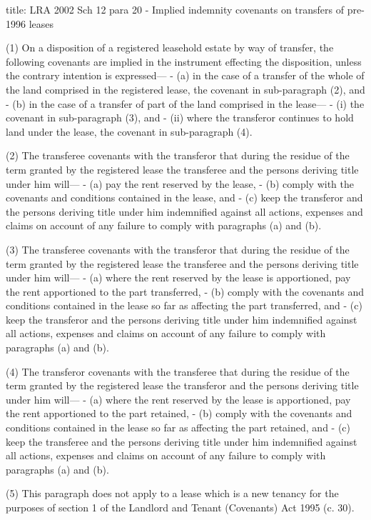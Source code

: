 \documentclass[
]{article}
\newenvironment{Shaded}{}{}
\newcommand{\NormalTok}[1]{#1}
\begin{document}
\begin{Shaded}
\begin{Highlighting}[]
\NormalTok{title: LRA 2002 Sch 12 para 20 {-} Implied indemnity covenants on transfers of pre{-}1996 leases}

\NormalTok{(1) On a disposition of a registered leasehold estate by way of transfer, the following covenants are implied in the instrument effecting the disposition, unless the contrary intention is expressed—}
\NormalTok{{-} (a) in the case of a transfer of the whole of the land comprised in the registered lease, the covenant in sub{-}paragraph (2), and}
\NormalTok{{-} (b) in the case of a transfer of part of the land comprised in the lease—}
\NormalTok{    {-} (i) the covenant in sub{-}paragraph (3), and}
\NormalTok{    {-} (ii) where the transferor continues to hold land under the lease, the covenant in sub{-}paragraph (4).}

\NormalTok{(2) The transferee covenants with the transferor that during the residue of the term granted by the registered lease the transferee and the persons deriving title under him will—}
\NormalTok{{-} (a) pay the rent reserved by the lease,}
\NormalTok{{-} (b) comply with the covenants and conditions contained in the lease, and}
\NormalTok{{-} (c) keep the transferor and the persons deriving title under him indemnified against all actions, expenses and claims on account of any failure to comply with paragraphs (a) and (b).}

\NormalTok{(3) The transferee covenants with the transferor that during the residue of the term granted by the registered lease the transferee and the persons deriving title under him will—}
\NormalTok{{-} (a) where the rent reserved by the lease is apportioned, pay the rent apportioned to the part transferred,}
\NormalTok{{-} (b) comply with the covenants and conditions contained in the lease so far as affecting the part transferred, and}
\NormalTok{{-} (c) keep the transferor and the persons deriving title under him indemnified against all actions, expenses and claims on account of any failure to comply with paragraphs (a) and (b).}

\NormalTok{(4) The transferor covenants with the transferee that during the residue of the term granted by the registered lease the transferor and the persons deriving title under him will—}
\NormalTok{{-} (a) where the rent reserved by the lease is apportioned, pay the rent apportioned to the part retained,}
\NormalTok{{-} (b) comply with the covenants and conditions contained in the lease so far as affecting the part retained, and}
\NormalTok{{-} (c) keep the transferee and the persons deriving title under him indemnified against all actions, expenses and claims on account of any failure to comply with paragraphs (a) and (b).}

\NormalTok{(5) This paragraph does not apply to a lease which is a new tenancy for the purposes of section 1 of the Landlord and Tenant (Covenants) Act 1995 (c. 30).}
\end{Highlighting}
\end{Shaded}
\end{document}
